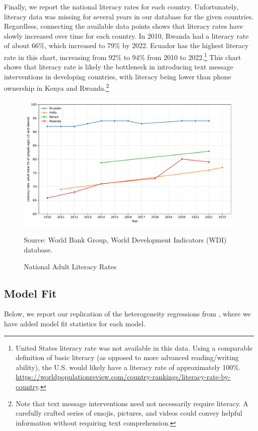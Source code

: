 \documentclass[12pt]{article}
\begin{document}
Finally, we report the national literacy rates for each country. Unfortunately, literacy data was missing for several years in our database for the given countries. Regardless, connecting the available data points shows that literacy rates have slowly increased over time for each country. In 2010, Rwanda had a literacy rate of about 66\%, which increased to 79\% by 2022. Ecuador has the highest literacy rate in this chart, increasing from 92\% to 94\% from 2010 to 2022.\footnote{United States literacy rate was not available in this data. Using a comparable definition of basic literacy (as opposed to more advanced reading/writing ability), the U.S. would likely have a literacy rate of approximately 100\%. \url{https://worldpopulationreview.com/country-rankings/literacy-rate-by-country}.} This chart shows that literacy rate is likely the bottleneck in introducing text message interventions in developing countries, with literacy being lower than phone ownership in Kenya and Rwanda.\footnote{Note that text message interventions need not necessarily require literacy. A carefully crafted series of emojis, pictures, and videos could convey helpful information without requiring text comprehension.}

\begin{figure}[H]
    \centering
    \caption{National Adult Literacy Rates}
    \includegraphics[width=\textwidth]{../output/literacy_rate.pdf}
    \begin{minipage}{0.9\textwidth}
    \footnotesize
    Source: World Bank Group, World Development Indicators (WDI) database. 
    \end{minipage}
    \label{fig:literacy_rate}
\end{figure}

\subsection{Model Fit}
Below, we report our replication of the heterogeneity regressions from \textcite{fabregas_digital_2025}, where we have added model fit statistics for each model.
\end{document}

